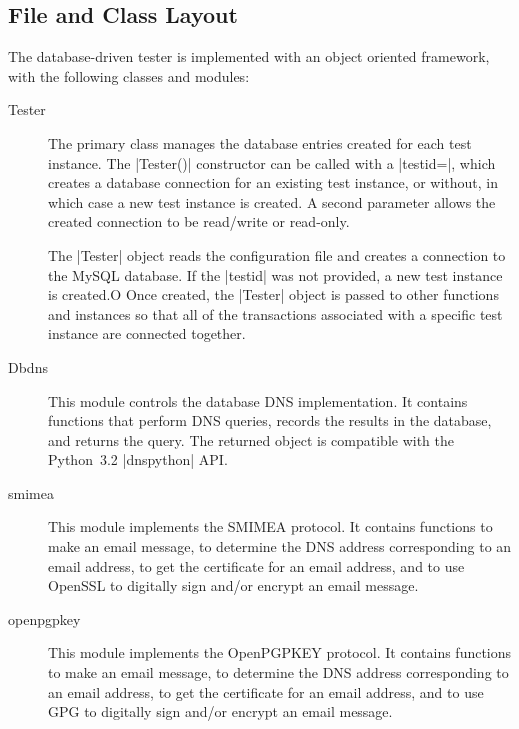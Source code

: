 \documentclass[preprint,3p]{elsarticle}
\begin{document}
\subsection{File and Class Layout}
The database-driven tester is implemented with an object oriented
framework, with the following classes and modules:

\begin{description}
\item[Tester] The primary class manages the database entries
created for each test instance. The |Tester()| constructor can be
called with a |testid=|, which creates a database connection for an
existing test instance, or without, in which case a new test instance
is created. A second parameter allows the created connection to be
read/write or read-only.

The |Tester| object reads the configuration file and creates a
connection to the MySQL database. If the |testid| was not provided, a
new test instance is created.O Once created, the |Tester| object is
passed to other functions and instances so that all of the
transactions associated with a specific test instance are connected
together.

\item[Dbdns] This module controls the database DNS
implementation. It contains functions that perform DNS queries,
records the results in the database, and returns the query. The
returned object  is compatible with the Python~3.2 |dnspython| API.

\item[smimea] This module implements the SMIMEA protocol. It contains
  functions to make an email message, to determine the DNS address
  corresponding to an email address, to get the certificate for an
  email address, and to use OpenSSL to digitally sign and/or encrypt
  an email message.

\item[openpgpkey] This module implements the OpenPGPKEY protocol. It contains
  functions to make an email message, to determine the DNS address
  corresponding to an email address, to get the certificate for an
  email address, and to use GPG to digitally sign and/or encrypt
  an email message.

\end{description}
\end{document}
